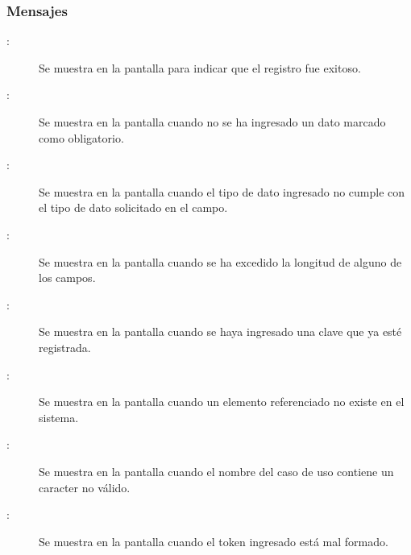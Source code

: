 \subsubsection{Mensajes}

	
\begin{description}
	\item[ :] Se muestra en la pantalla  para indicar que el registro fue exitoso.
	\item[:] Se muestra en la pantalla  cuando no se ha ingresado un dato marcado como obligatorio.
	\item[:] Se muestra en la pantalla  cuando el tipo de dato ingresado no cumple con el tipo de dato solicitado en el campo.
	\item[:] Se muestra en la pantalla  cuando se ha excedido la longitud de alguno de los campos.
	\item[:] Se muestra en la pantalla  cuando se haya ingresado una clave que ya esté registrada.
	\item[:] Se muestra en la pantalla  cuando un elemento referenciado no existe en el sistema.
	\item[:] Se muestra en la pantalla  cuando el nombre del caso de uso contiene un caracter no válido.
	\item[:] Se muestra en la pantalla  cuando el token ingresado está mal formado.
\end{description}
